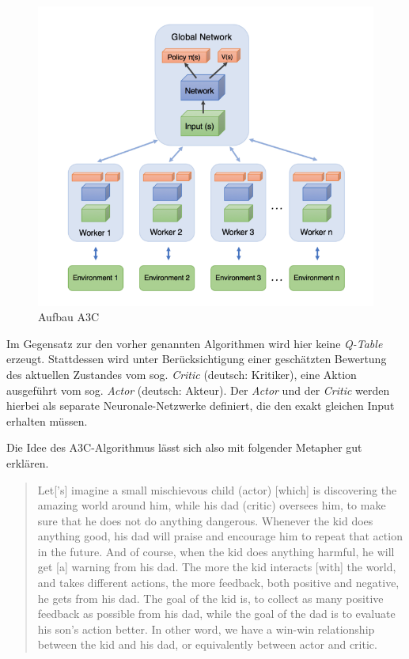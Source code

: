 \documentclass[sigconf,nonacm]{acmart}
\begin{document}
\begin{figure}[hbt!]
\includegraphics[width=\columnwidth]{a3c.png}
\caption{Aufbau A3C \cite{a3cmedium}}
\label{fig:a3c}
\end{figure}

Im Gegensatz zur den vorher genannten Algorithmen wird hier keine \textit{Q-Table} erzeugt. Stattdessen wird unter Berücksichtigung einer geschätzten Bewertung des aktuellen Zustandes vom sog. \textit{Critic} (deutsch: Kritiker), eine Aktion ausgeführt vom sog. \textit{Actor} (deutsch: Akteur). Der \textit{Actor} und der \textit{Critic} werden hierbei als separate Neuronale-Netzwerke definiert, die den exakt gleichen Input erhalten müssen.

Die Idee des A3C-Algorithmus lässt sich also mit folgender Metapher gut erklären.
\begin{quote}
Let['s] imagine a small mischievous child (actor) [which] is discovering the amazing world around him, while his dad (critic) oversees him, to make sure that he does not do anything dangerous. Whenever the kid does anything good, his dad will praise and encourage him to repeat that action in the future. And of course, when the kid does anything harmful, he will get [a] warning from his dad. The more the kid interacts [with] the world, and takes different actions, the more feedback, both positive and negative, he gets from his dad. The goal of the kid is, to collect as many positive feedback as possible from his dad, while the goal of the dad is to evaluate his son's action better. In other word, we have a win-win relationship between the kid and his dad, or equivalently between actor and critic.\cite{nguyen}
\end{quote}
\end{document}
